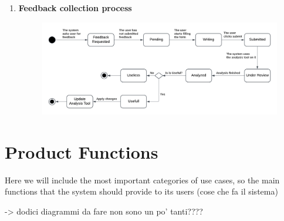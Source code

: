 \begin{enumerate}
\item \textbf{Feedback collection process}
\begin{figure}[H]
    \centering
    \includegraphics[width=1\linewidth]{RASD//Images/feedback2.png}
    \caption{}
    \label{fig:enter-label}
\end{figure}

\end{enumerate}

\pagebreak
\section{Product Functions}

Here we will include the most important categories of use cases, so the main functions that the system should provide to its users (cose che fa il sistema)

-> dodici diagrammi da fare non sono un po' tanti????

